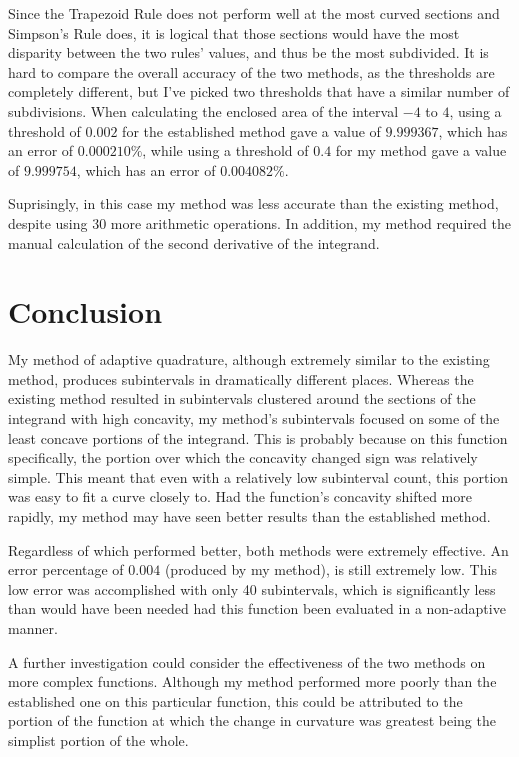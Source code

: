 \documentclass{paper}
\begin{document}
Since the Trapezoid Rule does not perform well at the most curved sections and Simpson's Rule does, it is logical that those sections would have the most disparity between the two rules' values, and thus be the most subdivided.
It is hard to compare the overall accuracy of the two methods, as the thresholds are completely different, but I've picked two thresholds that have a similar number of subdivisions.
When calculating the enclosed area of the interval \(-4\) to \(4\), using a threshold of \(0.002\) for the established method gave a value of \(9.999367\), which has an error of \(0.000210\%\), while using a threshold of \(0.4\) for my method gave a value of \(9.999754\), which has an error of \(0.004082\%\).

Suprisingly, in this case my method was less accurate than the existing method, despite using 30 more arithmetic operations.
In addition, my method required the manual calculation of the second derivative of the integrand.

\section{Conclusion}
\label{sec:conclusion}
My method of adaptive quadrature, although extremely similar to the existing method, produces subintervals in dramatically different places.
Whereas the existing method resulted in subintervals clustered around the sections of the integrand with high concavity, my method's subintervals focused on some of the least concave portions of the integrand.
This is probably because on this function specifically, the portion over which the concavity changed sign was relatively simple.
This meant that even with a relatively low subinterval count, this portion was easy to fit a curve closely to.
Had the function's concavity shifted more rapidly, my method may have seen better results than the established method.

Regardless of which performed better, both methods were extremely effective. An error percentage of \(0.004\) (produced by my method), is still extremely low.
This low error was accomplished with only 40 subintervals, which is significantly less than would have been needed had this function been evaluated in a non-adaptive manner.

A further investigation could consider the effectiveness of the two methods on more complex functions.
Although my method performed more poorly than the established one on this particular function, this could be attributed to the portion of the function at which the change in curvature was greatest being the simplist portion of the whole.

\label{mylastpage}
\newpage
\listoffigures
\vspace{1cm}
\listofsnippets
\vspace{1cm}
{}
\printbibliography
\thispagestyle{empty}
\end{document}
